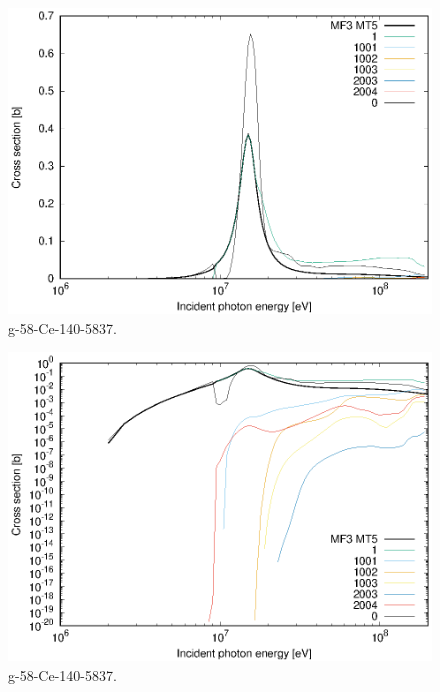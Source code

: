 \begin{figure}
 \includegraphics[width=\linewidth]{eps/g_58-Ce-140_5837.eps}
  \caption{g-58-Ce-140-5837.}
\end{figure}
\begin{figure}
 \includegraphics[width=\linewidth]{eps-log/g_58-Ce-140_5837.eps}
 \caption{g-58-Ce-140-5837.}
\end{figure}
\newpage \clearpage

